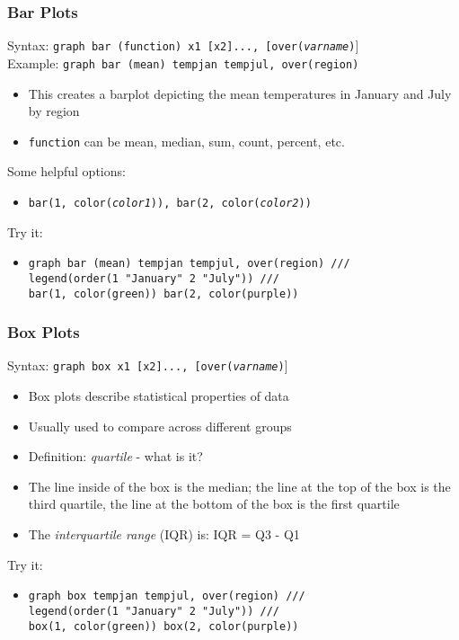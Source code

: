 \documentclass[11pt]{beamer}
\begin{document}
\begin{frame}
\frametitle{Bar Plots}
Syntax: \texttt{graph bar (function) x1 [x2]..., [over(\textit{varname})}] \\ \medskip
Example: \texttt{graph bar (mean) tempjan tempjul, over(region)} \bigskip
\begin{itemize}
	\item This creates a barplot depicting the mean temperatures in January and July by region
	\item \texttt{function} can be mean, median, sum, count, percent, etc.
\end{itemize} \bigskip \pause
Some helpful options:
\begin{itemize}
	\item \texttt{bar(1, color(\textit{color1})), bar(2, color(\textit{color2}))}
\end{itemize} \bigskip \pause
Try it:
\begin{itemize}
	\item[] \texttt{graph bar (mean) tempjan tempjul, over(region) /// \\
					legend(order(1 "January" 2 "July")) /// \\
					bar(1, color(green)) bar(2, color(purple)) }
\end{itemize}
\end{frame}

\begin{frame}
\frametitle{Box Plots}
Syntax: \texttt{graph box x1 [x2]..., [over(\textit{varname})}] \\ \medskip
\begin{itemize}
        \item Box plots describe statistical properties of data
        \item Usually used to compare across different groups \pause
        \item Definition: \textit{quartile} - what is it? \pause
        \item The line inside of the box is the median; the line at the top of the box is the third quartile, the line at the bottom of the box is the first quartile
        \item The \textit{interquartile range} (IQR) is: IQR =  Q3 - Q1 \pause
\end{itemize} \bigskip
Try it:
\begin{itemize}
	\item[] \texttt{graph box tempjan tempjul, over(region) /// \\
		legend(order(1 "January" 2 "July")) /// \\
		box(1, color(green)) box(2, color(purple)) }
\end{itemize}
\end{frame}
\end{document}
